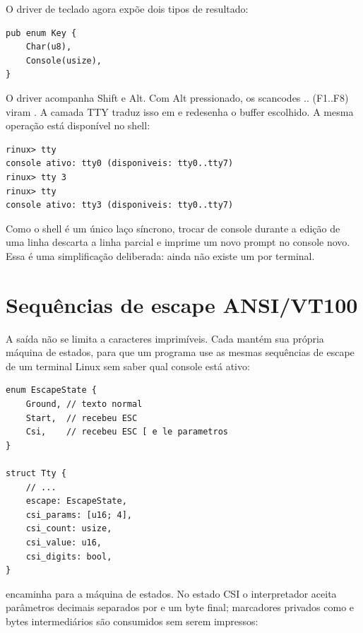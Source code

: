 O driver de teclado agora exp\~oe dois tipos de resultado:

\begin{lstlisting}[caption={Tipo de resultado do teclado.},label={lst:keyenum}]
pub enum Key {
    Char(u8),
    Console(usize),
}
\end{lstlisting}

O driver acompanha Shift e Alt. Com Alt pressionado, os scancodes
.. (F1..F8) viram . A camada
TTY traduz isso em  e redesenha o buffer escolhido. A
mesma opera\c{c}\~ao est\'a dispon\'ivel no shell:

\begin{lstlisting}[style=shell,caption={Trocando de console pelo shell.},label={lst:ttyshell}]
rinux> tty
console ativo: tty0 (disponiveis: tty0..tty7)
rinux> tty 3
rinux> tty
console ativo: tty3 (disponiveis: tty0..tty7)
\end{lstlisting}

Como o shell \'e um \'unico la\c{c}o s\'incrono, trocar de console durante a
edi\c{c}\~ao de uma linha descarta a linha parcial e imprime um novo prompt no
console novo. Essa \'e uma simplifica\c{c}\~ao deliberada: ainda n\~ao existe
um  por terminal.

\section{Sequ\^encias de escape ANSI/VT100}

A sa\'ida n\~ao se limita a caracteres imprim\'iveis. Cada  mant\'em
sua pr\'opria m\'aquina de estados, para que um programa use as mesmas
sequ\^encias de escape de um terminal Linux sem saber qual console est\'a ativo:

\begin{lstlisting}[caption={Estado de escape guardado em cada console.},label={lst:ttyescape}]
enum EscapeState {
    Ground, // texto normal
    Start,  // recebeu ESC
    Csi,    // recebeu ESC [ e le parametros
}

struct Tty {
    // ...
    escape: EscapeState,
    csi_params: [u16; 4],
    csi_count: usize,
    csi_value: u16,
    csi_digits: bool,
}
\end{lstlisting}

 encaminha  para a m\'aquina de estados. No estado
CSI o interpretador aceita par\^ametros decimais separados por \code{;} e um
byte final; marcadores privados como  e bytes intermedi\'arios s\~ao
consumidos sem serem impressos:

